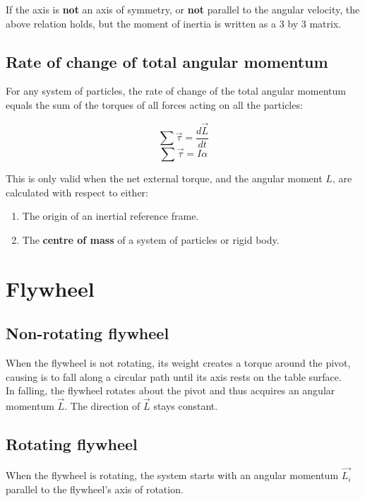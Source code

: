 \documentclass[11pt]{article}
\begin{document}
If the axis is \textbf{not} an axis of symmetry, or \textbf{not} parallel to the angular velocity, the above relation holds, but the moment of inertia is written as a 3 by 3 matrix.

\newpage

\subsection{Rate of change of total angular momentum}
\label{sec:orge4c10d2}
For any system of particles, the rate of change of the total angular momentum equals the sum of the torques of all forces acting on all the particles:

\[\sum \vec{\tau} = \frac{d \vec{L}}{dt}\]
\[\sum \vec{\tau} = I \alpha\]

This is only valid when the net external torque, and the angular moment \(L\), are calculated with respect to either:
\begin{enumerate}
\item The origin of an inertial reference frame.
\item The \textbf{centre of mass} of a system of particles or rigid body.
\end{enumerate}


\section{Flywheel}
\label{sec:orgc5bc352}

\subsection{Non-rotating flywheel}
\label{sec:org5565722}
When the flywheel is not rotating, its weight creates a torque around the pivot, causing is to fall along a circular path until its axis rests on the table surface.
\\[0pt]

In falling, the flywheel rotates about the pivot and thus acquires an angular momentum \(\vec{L}\). The direction of \(\vec{L}\) stays constant.

\subsection{Rotating flywheel}
\label{sec:orge4bd5ed}
When the flywheel is rotating, the system starts with an angular momentum \(\vec{L_i}\) parallel to the flywheel's axis of rotation.
\\[0pt]
\end{document}
